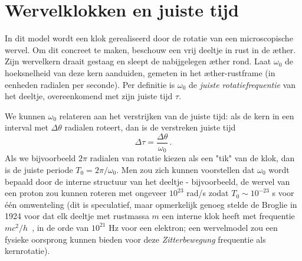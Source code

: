 \section{Wervelklokken en juiste tijd}


In dit model wordt een klok gerealiseerd door de rotatie van een microscopische wervel. Om dit concreet te maken, beschouw een vrij
deeltje
in rust in de æther. Zijn wervelkern draait gestaag en sleept de nabijgelegen æther rond. Laat $\omega_0$ de hoeksnelheid van deze kern aanduiden, gemeten in het æther-rustframe (in eenheden radialen per seconde). Per definitie is $\omega_0$ de \emph{juiste rotatiefrequentie} van het deeltje, overeenkomend met zijn juiste tijd $\tau$.

We kunnen $\omega_0$ relateren aan het verstrijken van de juiste tijd: als de kern in een interval met $\Delta \theta$ radialen roteert, dan is de verstreken juiste tijd
\[
    \Delta \tau = \frac{\Delta \theta}{\omega_0} \,.
\]
Als we bijvoorbeeld $2\pi$ radialen van rotatie kiezen als een "tik" van de klok, dan is de juiste periode $T_0 = 2\pi/\omega_0$. Men zou zich kunnen voorstellen dat $\omega_0$ wordt bepaald door de interne structuur van het deeltje - bijvoorbeeld, de wervel van een proton zou kunnen roteren met ongeveer $10^{23}$ rad/s zodat $T_0 \sim 10^{-23}$ s voor één omwenteling (dit is speculatief, maar opmerkelijk genoeg stelde de Broglie in 1924 voor dat elk deeltje met rustmassa $m$ een interne klok heeft met frequentie $mc^2/h$~\cite{deBroglie1924-frequency}, in de orde van $10^{21}$ Hz voor een elektron; een wervelmodel zou een fysieke oorsprong kunnen bieden voor deze \emph{Zitterbewegung} frequentie als kernrotatie).

